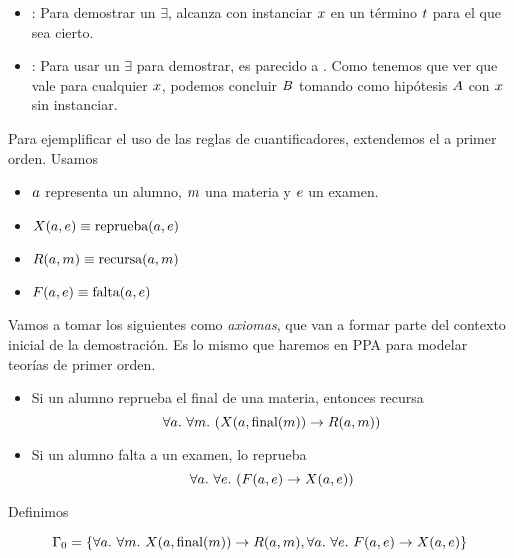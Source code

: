 \proofTreeExistsI
\proofTreeExistsE

\begin{itemize}
    \item {}: Para demostrar un $\exists$, alcanza con instanciar $x$ en un término $t$ para el que sea cierto.
    \item {}: Para usar un $\exists$ para demostrar, es parecido a . Como tenemos que ver que vale para cualquier $x$, podemos concluir $B$ tomando como hipótesis $A$ con $x$ sin instanciar. 
\end{itemize}

\begin{ejemplo}
    \label{nd:ex:exam-nd-lpo}
    Para ejemplificar el uso de las reglas de cuantificadores, extendemos el  a primer orden. Usamos

    \begin{itemize}
        \item $a$ representa un alumno, $m$ una materia y $e$ un examen.
        \item $X(a, e) \equiv \textrm{reprueba}(a, e)$
        \item $R(a, m) \equiv \textrm{recursa}(a, m)$
        \item $F(a, e) \equiv \textrm{falta}(a, e)$
    \end{itemize}

    Vamos a tomar los siguientes como \textit{axiomas}, que van a formar parte del contexto inicial de la demostración. Es lo mismo que haremos en PPA para modelar teorías de primer orden.

    \begin{itemize}
        \item Si un alumno reprueba el final de una materia, entonces recursa
        \[
            \forall a .\ \forall m .\
                (X(a, \textrm{final}(m)) \to
                R(a, m))
        \]
        \item Si un alumno falta a un examen, lo reprueba
        \[
            \forall a .\ \forall e .\
                (F(a, e) \to X(a, e))
        \]
    \end{itemize}

    Definimos

    \[
        \Gamma_0 = \{
            \forall a .\ \forall m .\
                X(a, \textrm{final}(m)) \to
                R(a, m),
            \forall a .\ \forall e .\
                F(a, e) \to X(a, e)
        \}
    \]


\end{ejemplo}
